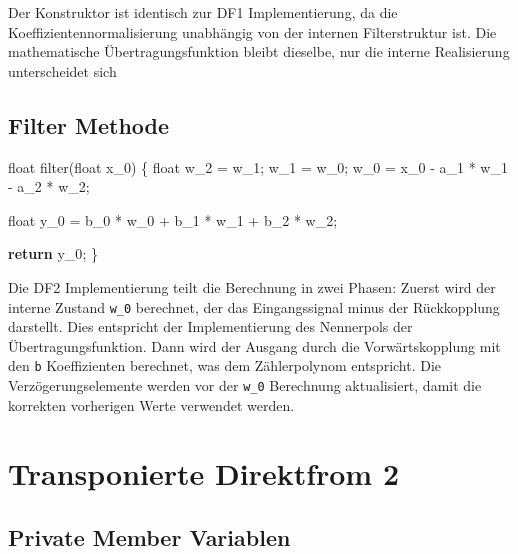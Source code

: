\documentclass[
  ngerman,
  letterpaper,
  DIV=11]{scrreprt}
\newenvironment{Shaded}{\begin{snugshade}}{\end{snugshade}}
\newcommand{\ControlFlowTok}[1]{\textcolor[rgb]{0.00,0.23,0.31}{\textbf{#1}}}
\newcommand{\DataTypeTok}[1]{\textcolor[rgb]{0.68,0.00,0.00}{#1}}
\newcommand{\NormalTok}[1]{\textcolor[rgb]{0.00,0.23,0.31}{#1}}
\newcommand{\OperatorTok}[1]{\textcolor[rgb]{0.37,0.37,0.37}{#1}}
\begin{document}
Der Konstruktor ist identisch zur DF1 Implementierung, da die
Koeffizientennormalisierung unabhängig von der internen Filterstruktur
ist. Die mathematische Übertragungsfunktion bleibt dieselbe, nur die
interne Realisierung unterscheidet sich

\subsection{Filter Methode}\label{filter-methode-1}

\begin{Shaded}
\begin{Highlighting}[]
\DataTypeTok{float}\NormalTok{ filter}\OperatorTok{(}\DataTypeTok{float}\NormalTok{ x\_0}\OperatorTok{)}
\OperatorTok{\{}
  \DataTypeTok{float}\NormalTok{ w\_2 }\OperatorTok{=}\NormalTok{ w\_1}\OperatorTok{;}
\NormalTok{  w\_1 }\OperatorTok{=}\NormalTok{ w\_0}\OperatorTok{;}
\NormalTok{  w\_0 }\OperatorTok{=}\NormalTok{ x\_0 }\OperatorTok{{-}}\NormalTok{ a\_1 }\OperatorTok{*}\NormalTok{ w\_1 }\OperatorTok{{-}}\NormalTok{ a\_2 }\OperatorTok{*}\NormalTok{ w\_2}\OperatorTok{;}

  \DataTypeTok{float}\NormalTok{ y\_0 }\OperatorTok{=}\NormalTok{ b\_0 }\OperatorTok{*}\NormalTok{ w\_0 }\OperatorTok{+}\NormalTok{ b\_1 }\OperatorTok{*}\NormalTok{ w\_1 }\OperatorTok{+}\NormalTok{ b\_2 }\OperatorTok{*}\NormalTok{ w\_2}\OperatorTok{;}

  \ControlFlowTok{return}\NormalTok{ y\_0}\OperatorTok{;}
\OperatorTok{\}}  
\end{Highlighting}
\end{Shaded}

Die DF2 Implementierung teilt die Berechnung in zwei Phasen: Zuerst wird
der interne Zustand \texttt{w\_0} berechnet, der das Eingangssignal
minus der Rückkopplung darstellt. Dies entspricht der Implementierung
des Nennerpols der Übertragungsfunktion. Dann wird der Ausgang durch die
Vorwärtskopplung mit den \texttt{b} Koeffizienten berechnet, was dem
Zählerpolynom entspricht. Die Verzögerungselemente werden vor der
\texttt{w\_0} Berechnung aktualisiert, damit die korrekten vorherigen
Werte verwendet werden.

\section{Transponierte Direktfrom 2}\label{transponierte-direktfrom-2}

\subsection{Private Member Variablen}\label{private-member-variablen-2}
\end{document}
